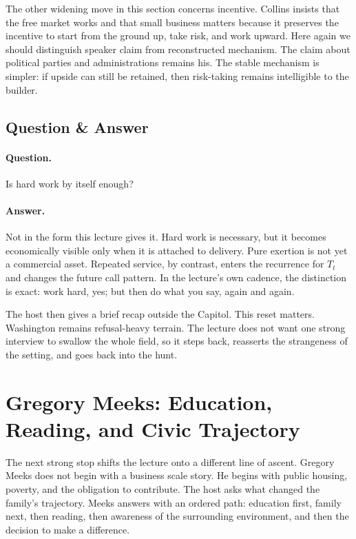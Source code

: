 The other widening move in this section concerns incentive. Collins insists that the free market works and that small business matters because it preserves the incentive to start from the ground up, take risk, and work upward. Here again we should distinguish speaker claim from reconstructed mechanism. The claim about political parties and administrations remains his. The stable mechanism is simpler: if upside can still be retained, then risk-taking remains intelligible to the builder.

\subsection{Question \& Answer}

\paragraph{Question.} Is hard work by itself enough?

\paragraph{Answer.} Not in the form this lecture gives it. Hard work is necessary, but it becomes economically visible only when it is attached to delivery. Pure exertion is not yet a commercial asset. Repeated service, by contrast, enters the recurrence for $T_t$ and changes the future call pattern. In the lecture's own cadence, the distinction is exact: work hard, yes; but then do what you say, again and again.

The host then gives a brief recap outside the Capitol. This reset matters. Washington remains refusal-heavy terrain. The lecture does not want one strong interview to swallow the whole field, so it steps back, reasserts the strangeness of the setting, and goes back into the hunt.

\section{Gregory Meeks: Education, Reading, and Civic Trajectory}

The next strong stop shifts the lecture onto a different line of ascent. Gregory Meeks does not begin with a business scale story. He begins with public housing, poverty, and the obligation to contribute. The host asks what changed the family's trajectory. Meeks answers with an ordered path: education first, family next, then reading, then awareness of the surrounding environment, and then the decision to make a difference.

